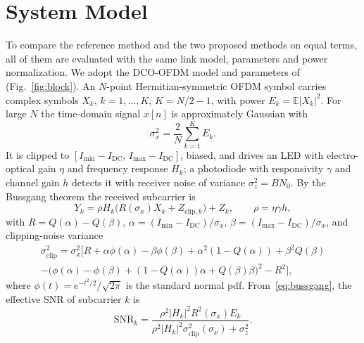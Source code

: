 \documentclass[conference]{IEEEtran}
\begin{document}
\section{System Model}\label{sec:model}
To compare the reference method and the two proposed methods on equal terms, all of them are evaluated with the same link model, parameters and power normalization. We adopt the DCO-OFDM model and parameters of~\cite{pham2026} (Fig.~\ref{fig:block}). An $N$-point Hermitian-symmetric OFDM symbol carries complex symbols $X_k$, $k=1,\dots,K$, $K=N/2-1$, with power $E_k=\mathbb{E}|X_k|^2$. For large $N$ the time-domain signal $x[n]$ is approximately Gaussian with
\begin{equation}
\sigma_x^2=\frac{2}{N}\sum_{k=1}^{K}E_k .
\end{equation}
It is clipped to $[I_{\min}-I_{\mathrm{DC}},\,I_{\max}-I_{\mathrm{DC}}]$, biased, and drives an LED with electro-optical gain $\eta$ and frequency response $H_k$; a photodiode with responsivity $\gamma$ and channel gain $h$ detects it with receiver noise of variance $\sigma_z^2=BN_0$. By the Bussgang theorem the received subcarrier is
\begin{equation}
Y_k=\rho H_k\big(R(\sigma_x)X_k+Z_{\mathrm{clip},k}\big)+Z_k,\qquad \rho=\eta\gamma h,\label{eq:bussgang}
\end{equation}
with $R=Q(\alpha)-Q(\beta)$, $\alpha=(I_{\min}-I_{\mathrm{DC}})/\sigma_x$, $\beta=(I_{\max}-I_{\mathrm{DC}})/\sigma_x$, and clipping-noise variance
\begin{multline}
\sigma^2_{\mathrm{clip}}=\sigma_x^2\big[R+\alpha\phi(\alpha)-\beta\phi(\beta)+\alpha^2(1-Q(\alpha))+\beta^2Q(\beta)\\
-\big(\phi(\alpha)-\phi(\beta)+(1-Q(\alpha))\alpha+Q(\beta)\beta\big)^2-R^2\big],\label{eq:clip}
\end{multline}
where $\phi(t)=e^{-t^2/2}/\sqrt{2\pi}$ is the standard normal pdf. From~\eqref{eq:bussgang}, the effective SNR of subcarrier $k$ is
\begin{equation}
\mathrm{SNR}_k=\frac{\rho^2|H_k|^2R^2(\sigma_x)E_k}{\rho^2|H_k|^2\sigma^2_{\mathrm{clip}}(\sigma_x)+\sigma_z^2}. \label{eq:snr}
\end{equation}
\end{document}
